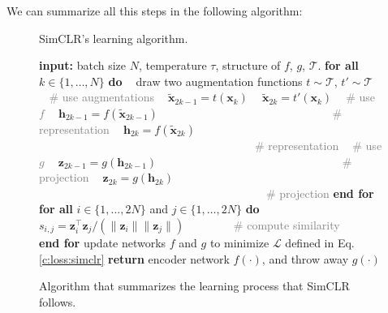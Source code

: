 We can summarize all this steps in the following algorithm:
\begin{figure}[H]
\begin{algorithm}[H]
    \caption{\label{alg:main} SimCLR's learning algorithm.}
    \begin{algorithmic}
        \STATE \textbf{input:} batch size $N$, temperature $\tau$, structure of $f$, $g$, $\mathcal{T}$.
        \STATE \textbf{for all} $k\in \{1, \ldots, N\}$ \textbf{do}
            \STATE $~~~~$draw two augmentation functions $t \!\sim\! \mathcal{T}$, $t' \!\sim\! \mathcal{T}$
            \STATE $~~~~$\textcolor{gray}{\# use augmentations} 
            \STATE $~~~~$$\tilde{\bm x}_{2k-1} = t(\bm x_k)$
            \STATE $~~~~$$\tilde{\bm x}_{2k} = t'(\bm x_k)$
            \STATE $~~~~$\textcolor{gray}{\# use $f$} 
            \STATE $~~~~$$\bm h_{2k-1} = f(\tilde{\bm x}_{2k-1})$  \textcolor{gray}{~~~~~~~~~~~~~~~~~~~~~~~~~~~~~~\# representation}
            \STATE $~~~~$$\bm h_{2k} = f(\tilde{\bm x}_{2k})$      \textcolor{gray}{~~~~~~~~~~~~~~~~~~~~~~~~~~~~~~~~~~~~~~\# representation}
            \STATE $~~~~$\textcolor{gray}{\# use $g$} 
            \STATE $~~~~$$\bm z_{2k-1} = g({\bm h}_{2k-1})$  \textcolor{gray}{~~~~~~~~~~~~~~~~~~~~~~~~~~~~~~~~\# projection}
            \STATE $~~~~$$\bm z_{2k} = g({\bm h}_{2k})$      \textcolor{gray}{~~~~~~~~~~~~~~~~~~~~~~~~~~~~~~~~~~~~~~~~\# projection}
        \STATE \textbf{end for}
        \STATE \textbf{for all} $i\in\{1, \ldots, 2N\}$ and $j\in\{1, \dots, 2N\}$ \textbf{do}
        \STATE $~~~~$ $s_{i,j} = \bm z_i^\top \bm z_j / (\lVert\bm z_i\rVert \lVert\bm z_j\rVert)$ \textcolor{gray}{~~~~~~~~\# compute similarity}\\
        \STATE \textbf{end for}
        \STATE update networks $f$ and $g$ to minimize $\mathcal{L}$ defined in Eq. \eqref{c:loss:simclr}
        \ENDFOR
        \STATE \textbf{return} encoder network $f(\cdot)$, and throw away $g(\cdot)$
    \end{algorithmic}
    \end{algorithm}
    
    \caption{Algorithm that summarizes the learning process that SimCLR follows.}
\end{figure}

